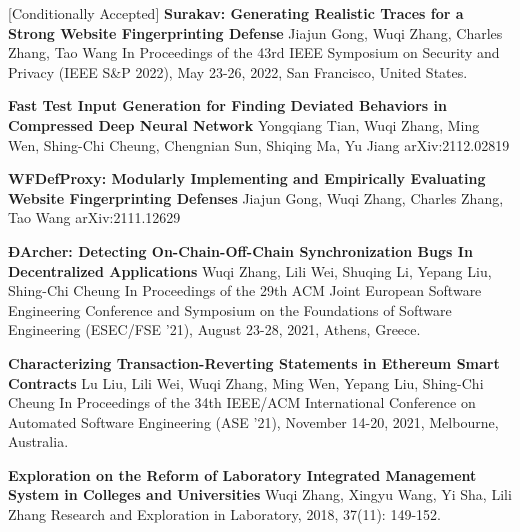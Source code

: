 %
%
%


\begin{scholarship}
	{[Conditionally Accepted] \textbf{Surakav: Generating Realistic Traces for a Strong Website Fingerprinting Defense}}
	{Jiajun Gong, Wuqi Zhang, Charles Zhang, Tao Wang}
	\scholarshipentry{}
	{In Proceedings of the 43rd IEEE Symposium on Security and Privacy (IEEE S\&P 2022), May 23-26, 2022, San Francisco, United States.}

	{\textbf{Fast Test Input Generation for Finding Deviated Behaviors in Compressed Deep Neural Network}}
	{Yongqiang Tian, Wuqi Zhang, Ming Wen, Shing-Chi Cheung, Chengnian Sun, Shiqing Ma, Yu Jiang}
	\scholarshipentry{}
	{arXiv:2112.02819}

	{\textbf{WFDefProxy: Modularly Implementing and Empirically Evaluating Website Fingerprinting Defenses}}
	{Jiajun Gong, Wuqi Zhang, Charles Zhang, Tao Wang}
	\scholarshipentry{}
	{arXiv:2111.12629}

	{\textbf{ÐArcher: Detecting On-Chain-Off-Chain Synchronization Bugs In Decentralized Applications}}
	{Wuqi Zhang, Lili Wei, Shuqing Li, Yepang Liu, Shing-Chi Cheung}
	\scholarshipentry{}
	{In Proceedings of the 29th ACM Joint European Software Engineering Conference and Symposium on the Foundations of Software Engineering (ESEC/FSE '21), August 23-28, 2021, Athens, Greece.}

	{\textbf{Characterizing Transaction-Reverting Statements in Ethereum Smart Contracts}}
	{Lu Liu, Lili Wei, Wuqi Zhang, Ming Wen, Yepang Liu, Shing-Chi Cheung}
	\scholarshipentry{}
	{In Proceedings of the 34th IEEE/ACM International Conference on Automated Software Engineering (ASE ’21), November 14-20, 2021, Melbourne, Australia.}

	{\textbf{Exploration on the Reform of Laboratory Integrated Management System in Colleges and Universities}}
	{Wuqi Zhang, Xingyu Wang, Yi Sha, Lili Zhang}
	\scholarshipentry{}
	{Research and Exploration in Laboratory, 2018, 37(11): 149-152.}
\end{scholarship}
